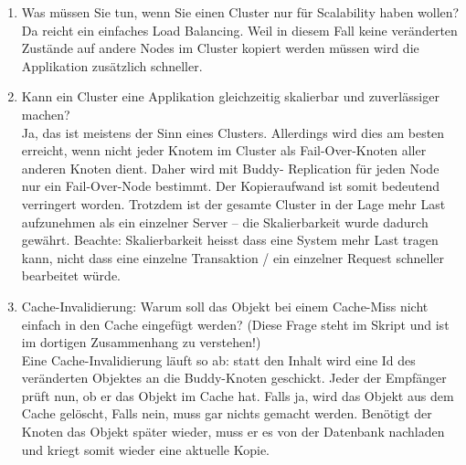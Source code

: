 \documentclass[a4paper,10pt]{scrreprt}
\begin{document}
\begin{enumerate}
\item  Was müssen Sie tun, wenn Sie einen Cluster nur für Scalability haben wollen?\\
Da reicht ein einfaches Load Balancing. Weil in diesem Fall keine veränderten Zustände auf andere
Nodes im Cluster kopiert werden müssen wird die Applikation zusätzlich schneller.
\item  Kann ein Cluster eine Applikation gleichzeitig skalierbar und zuverlässiger machen?\\
Ja, das ist meistens der Sinn eines Clusters. Allerdings wird dies am besten erreicht, wenn nicht jeder
Knotem im Cluster als Fail-Over-Knoten aller anderen Knoten dient. Daher wird mit Buddy-
Replication für jeden Node nur ein Fail-Over-Node bestimmt. Der Kopieraufwand ist somit bedeutend
verringert worden. Trotzdem ist der gesamte Cluster in der Lage mehr Last aufzunehmen als ein
einzelner Server – die Skalierbarkeit wurde dadurch gewährt.
Beachte: Skalierbarkeit heisst dass eine System mehr Last tragen kann, nicht dass eine einzelne
Transaktion / ein einzelner Request schneller bearbeitet würde.
\item  Cache-Invalidierung: Warum soll das Objekt bei einem Cache-Miss nicht einfach in den Cache
eingefügt werden? (Diese Frage steht im Skript und ist im dortigen Zusammenhang zu verstehen!)\\
Eine Cache-Invalidierung läuft so ab: statt den Inhalt wird eine Id des veränderten Objektes an die
Buddy-Knoten geschickt. Jeder der Empfänger prüft nun, ob er das Objekt im Cache hat. Falls ja,
wird das Objekt aus dem Cache gelöscht, Falls nein, muss gar nichts gemacht werden. Benötigt der
Knoten das Objekt später wieder, muss er es von der Datenbank nachladen und kriegt somit wieder
eine aktuelle Kopie.


\end{enumerate}
\end{document}
